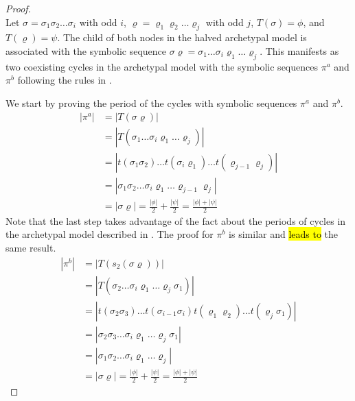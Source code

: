 \begin{proof} \phantom{x} \\
	Let $\sigma = \sigma_1\sigma_2 \dots \sigma_i$ with odd $i$, $\varrho = \varrho_1\varrho_2 \dots \varrho_j$ with odd $j$, $T(\sigma) = \phi$, and $T(\varrho) = \psi$.
	The child of both nodes in the halved archetypal model is associated with the symbolic sequence $\sigma\varrho = \sigma_1 \dots \sigma_i \varrho_1 \dots \varrho_j$.
	This manifests as two coexisting cycles in the archetypal model with the symbolic sequences $\pi^a$ and $\pi^b$ following the rules in .

	We start by proving the period of the cycles with symbolic sequences $\pi^a$ and $\pi^b$.
	\begin{align*}
		|\pi^a| & = |T(\sigma\varrho)|                                                                \\
		        & = |T(\sigma_1 \dots \sigma_i \varrho_1 \dots \varrho_j)|                            \\
		        & = |t(\sigma_1\sigma_2) \dots t(\sigma_i\varrho_1) \dots t(\varrho_{j-1}\varrho_j)|  \\
		        & = |\sigma_1\sigma_2 \dots \sigma_i \varrho_1 \dots \varrho_{j-1}\varrho_j|          \\
		        & = |\sigma\varrho| = \frac{|\phi|}{2} + \frac{|\psi|}{2} = \frac{|\phi| + |\psi|}{2}
	\end{align*}
	Note that the last step takes advantage of the fact about the periods of cycles in the archetypal model described in .
	The proof for $\pi^b$ is similar and \hl{leads to} the same result.
	\begin{align*}
		|\pi^b| & = |T(s_2(\sigma\varrho))|                                                                              \\
		        & = |T(\sigma_2 \dots \sigma_i \varrho_1 \dots \varrho_j \sigma_1)|                                      \\
		        & = |t(\sigma_2\sigma_3) \dots t(\sigma_{i-1}\sigma_i) t(\varrho_1\varrho_2) \dots t(\varrho_j\sigma_1)| \\
		        & = |\sigma_2\sigma_3 \dots \sigma_i \varrho_1 \dots \varrho_j \sigma_1|                                 \\
		        & = |\sigma_1\sigma_2 \dots \sigma_i \varrho_1 \dots \varrho_j|                                          \\
		        & = |\sigma\varrho| = \frac{|\phi|}{2} + \frac{|\psi|}{2} = \frac{|\phi| + |\psi|}{2}
	\end{align*}


\end{proof}
